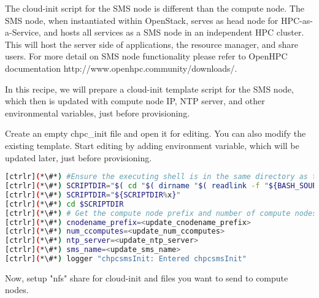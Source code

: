 	The cloud-init script for the SMS node is different than the compute node. The SMS node, when instantiated within OpenStack, serves as head node for HPC-as-a-Service, and hosts all services as a SMS node in an independent HPC cluster. This will host the server side of applications, the resource manager, and share users. For more detail on SMS node functionality please refer to OpenHPC documentation http://www.openhpc.community/downloads/.

	In this recipe, we will prepare a cloud-init template script for the SMS node, which then is updated with compute node IP, NTP server, and other environmental variables, just before provisioning. 

	Create an empty chpc\_init file and open it for editing. You can also modify the existing template. Start editing by adding environment variable, which will be updated later, just before provisioning.



\begin{lstlisting}[language=bash,keywords={}]
[ctrlr](*\#*) #Ensure the executing shell is in the same directory as the script.
[ctrlr](*\#*) SCRIPTDIR="$( cd "$( dirname "$( readlink -f "${BASH_SOURCE[0]}" )" )" && pwd -P && echo x)"
[ctrlr](*\#*) SCRIPTDIR="${SCRIPTDIR%x}"
[ctrlr](*\#*) cd $SCRIPTDIR
[ctrlr](*\#*) # Get the compute node prefix and number of compute nodes
[ctrlr](*\#*) cnodename_prefix=<update_cnodename_prefix>
[ctrlr](*\#*) num_ccomputes=<update_num_ccomputes>
[ctrlr](*\#*) ntp_server=<update_ntp_server>
[ctrlr](*\#*) sms_name=<update_sms_name>
[ctrlr](*\#*) logger "chpcsmsInit: Entered chpcsmsInit"

\end{lstlisting} 

	Now, setup "nfs" share for cloud-init and files you want to send to compute nodes.


